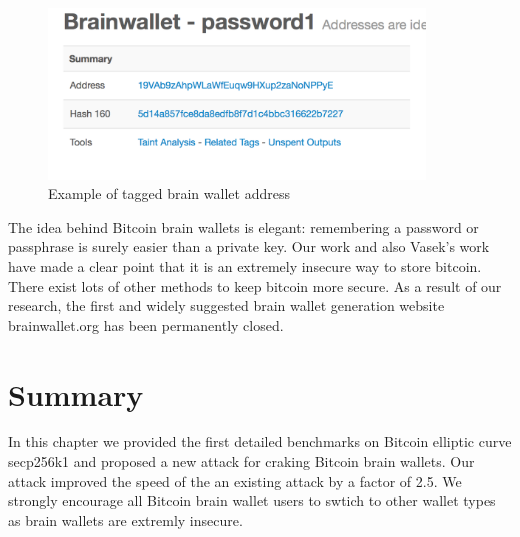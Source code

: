   \begin{figure}[h!]
  	\centering
  	\includegraphics[width=100mm]{./pics/tag_address.png}
  	\caption{Example of tagged brain wallet address }
  	\label{fig:tagged_address}
  \end{figure}
  
The idea behind Bitcoin brain wallets is elegant: remembering a password or passphrase is surely easier than a private key. Our work and also Vasek's work \cite{vasek2016bitcoin} have made a clear point that it is an extremely insecure way to store bitcoin. There exist lots of other methods to keep bitcoin more secure. As a result of our research, the first and widely suggested brain wallet generation website brainwallet.org has been permanently closed.  
\section{Summary}
In this chapter we provided the first detailed benchmarks on Bitcoin elliptic curve secp256k1 and proposed a new attack for craking Bitcoin brain wallets. Our attack improved the speed of the an existing attack by a factor of 2.5. We strongly encourage all Bitcoin brain wallet users to swtich to other wallet types as brain wallets are extremly insecure.

